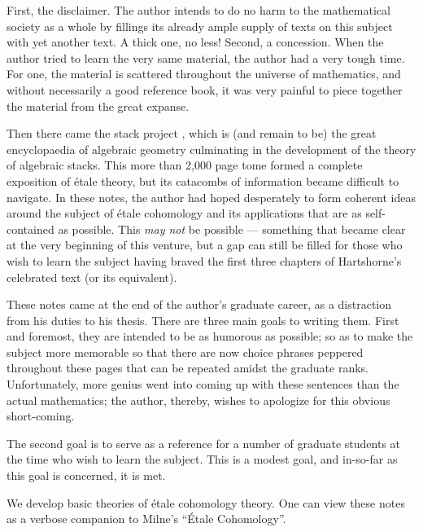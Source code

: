 \Preface

First, the disclaimer. The author intends to do no harm to the
mathematical society as a whole by fillings its already ample
supply of texts on this subject with yet another text. A thick
one, no less! Second, a concession. When the author tried to
learn the very same material, the author had a very tough time.
For one, the material is scattered throughout the universe of
mathematics, and without necessarily a good reference book, it
was very painful to piece together the material from the great
expanse.

Then there came the stack project \cite{Stack}, which is (and 
remain to be) the great encyclopaedia of algebraic geometry 
culminating in the development of the theory of algebraic stacks. 
This more than 2,000 page tome formed a complete exposition of 
\'etale theory, but its catacombs of information became difficult 
to navigate. In these notes, the author had hoped desperately to 
form coherent ideas around the subject of \'etale cohomology and 
its applications that are as self-contained as possible. This 
\emph{may not} be possible --- something that became clear at the 
very beginning of this venture, but a gap can still be filled for 
those who wish to learn the subject having braved the first three 
chapters of Hartshorne's celebrated text (or its equivalent).

These notes came at the end of the author's graduate career,
as a distraction from his duties to his thesis. There are three
main goals to writing them. First and foremost, they are intended
to be as humorous as possible; so as to make the subject more
memorable so that there are now choice phrases peppered throughout 
these pages that can be repeated amidst the graduate ranks. 
Unfortunately, more genius went into coming up with these sentences
than the actual mathematics; the author, thereby, wishes to 
apologize for this obvious short-coming.

The second goal is to serve as a reference for a number of 
graduate students at the time who wish to learn the subject. This
is a modest goal, and in-so-far as this goal is concerned, it
is met.

We develop basic theories of \'etale cohomology theory. One can
view these notes as a verbose companion to Milne's ``\'Etale
Cohomology''.
